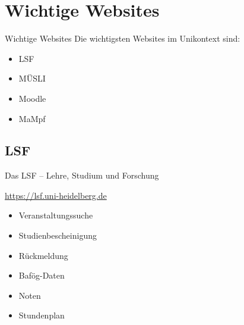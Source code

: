 
\section{Wichtige Websites}
\begin{frame}{Wichtige Websites}
    \large Die wichtigsten Websites im Unikontext sind:
    \begin{itemize}
        \item{LSF}
        \item{MÜSLI}
        \item{Moodle}
        \item{MaMpf}
    \end{itemize}
\end{frame}


\subsection{LSF}
\begin{frame}{Das LSF -- Lehre, Studium und Forschung}

    \large \url{https://lsf.uni-heidelberg.de} \\
    \begin{minipage}[t]{0.515\textwidth}
        \begin{itemize}
            \item{Veranstaltungssuche}
            \item{Studienbescheinigung}
            \item{Rückmeldung}
            \item{Bafög-Daten}
            \item{Noten}
            \item{Stundenplan}
        \end{itemize}
    \end{minipage}
    \begin{minipage}[t]{0.4\textwidth}
        \vspace{0.4cm}
        \begin{center}
        \end{center}
    \end{minipage}
\end{frame}

